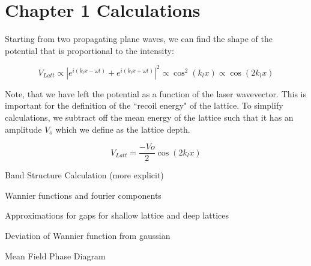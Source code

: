
\begin{savequote}[75mm]

\end{savequote}


\chapter{Chapter 1 Calculations}
\label{appendix:Ch1Cal}

Starting from two propagating plane waves, we can find the shape of the potential that is proportional to the intensity:

\begin{equation}
V_{Latt} \propto |e^{i (k_l x - \omega t) } + e^{i (k_l x + \omega t)}|^2 \propto  \cos^2{\left ( k_l x \right ) } \propto \cos{\left ( 2 k_l x \right ) }
\end{equation}

Note, that we have left the potential as a function of the laser wavevector. This is important for the definition of the ``recoil energy" of the lattice. To simplify calculations, we subtract off the mean energy of the lattice such that it has an amplitude $V_o$ which we define as the lattice depth. 

\begin{equation}
V_{Latt} = \frac{-Vo}{2} \cos{\left ( 2 k_l x \right ) }
\end{equation}



Band Structure Calculation (more explicit)

Wannier functions and fourier components

Approximations for gaps for shallow lattice and deep lattices

Deviation of Wannier function from gaussian

Mean Field Phase Diagram
